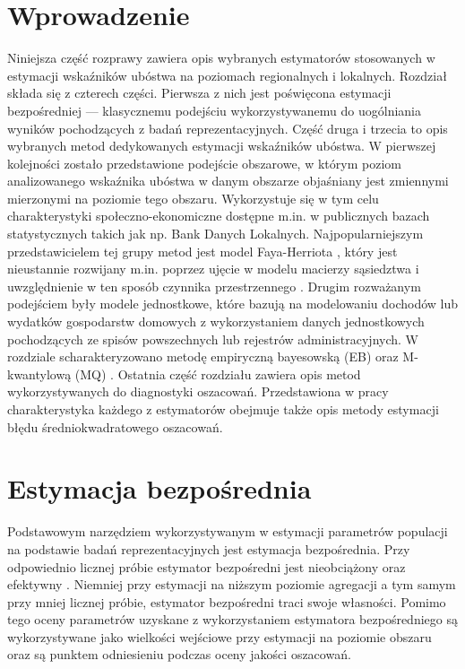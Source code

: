 \section{Wprowadzenie}

Niniejsza część rozprawy zawiera opis wybranych estymatorów stosowanych w estymacji wskaźników ubóstwa na poziomach regionalnych i lokalnych. Rozdział składa się z czterech części. Pierwsza z nich jest poświęcona estymacji bezpośredniej --- klasycznemu podejściu wykorzystywanemu do uogólniania wyników pochodzących z badań reprezentacyjnych. Część druga i trzecia to opis wybranych metod dedykowanych estymacji wskaźników ubóstwa. W pierwszej kolejności zostało przedstawione podejście obszarowe, w którym poziom analizowanego wskaźnika ubóstwa w danym obszarze objaśniany jest zmiennymi mierzonymi na poziomie tego obszaru. Wykorzystuje się w tym celu charakterystyki społeczno-ekonomiczne dostępne m.in. w publicznych bazach statystycznych takich jak np. Bank Danych Lokalnych. Najpopularniejszym przedstawicielem tej grupy metod jest model Faya-Herriota \citep{fh1979}, który jest nieustannie rozwijany m.in. poprzez ujęcie w modelu macierzy sąsiedztwa i uwzględnienie w ten sposób czynnika przestrzennego \citep{pratesi2008}. Drugim rozważanym podejściem były modele jednostkowe, które bazują na modelowaniu dochodów lub wydatków gospodarstw domowych z wykorzystaniem danych jednostkowych pochodzących ze spisów powszechnych lub rejestrów administracyjnych. W rozdziale scharakteryzowano metodę empiryczną bayesowską (EB) \citep{ebp2010} oraz M-kwantylową (MQ) \citep{mq2006}. Ostatnia część rozdziału zawiera opis metod wykorzystywanych do diagnostyki oszacowań. Przedstawiona w pracy charakterystyka każdego z estymatorów obejmuje także opis metody estymacji błędu średniokwadratowego oszacowań. 

\section{Estymacja bezpośrednia}

Podstawowym narzędziem wykorzystywanym w estymacji parametrów populacji na podstawie badań reprezentacyjnych jest estymacja bezpośrednia. Przy odpowiednio licznej próbie estymator bezpośredni jest nieobciążony oraz efektywny \citep{rao2015}. Niemniej przy estymacji na niższym poziomie agregacji a tym samym przy mniej licznej próbie, estymator bezpośredni traci swoje własności. Pomimo tego oceny parametrów uzyskane z wykorzystaniem estymatora bezpośredniego są wykorzystywane jako wielkości wejściowe przy estymacji na poziomie obszaru oraz są punktem odniesieniu podczas oceny jakości oszacowań.

